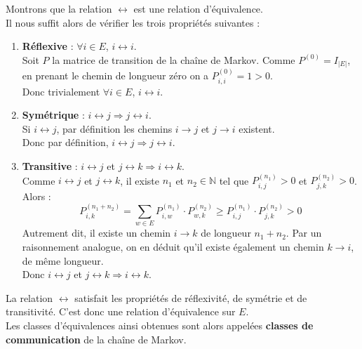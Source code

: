 \documentclass{article}
\begin{document}
\begin{tcolorbox}[colback=white,colframe=green!80!black,title=Démonstration, breakable]
Montrons que la relation $\leftrightarrow$ est une relation d'équivalence. \\

Il nous suffit alors de vérifier les trois propriétés suivantes :
\begin{enumerate}
    \item \textbf{Réflexive} : $\forall i \in E$, $i \leftrightarrow i$. \\
        Soit $P$ la matrice de transition de la chaîne de Markov.
        Comme $P^{(0)} = I_{|E|}$, en prenant le chemin de longueur zéro on a $P_{i,i}^{(0)} = 1 > 0$. \\
        Donc trivialement $\forall i \in E$, $i \leftrightarrow i$.
    \item \textbf{Symétrique} : $i \leftrightarrow j \Rightarrow j \leftrightarrow i$. \\
        Si $i \leftrightarrow j$, par définition les chemins $i \to j$ et $j \to i$ existent. \\
        Donc par définition, $i \leftrightarrow j \Rightarrow j \leftrightarrow i$.
\newpage %
    \item \textbf{Transitive} : $i \leftrightarrow j$ et $j \leftrightarrow k \Rightarrow i \leftrightarrow k$. \\
        Comme $i \leftrightarrow j$ et $j \leftrightarrow k$, il existe $n_1$ et $n_2 \in \mathbb{N}$ tel que $P_{i,j}^{(n_1)} > 0$ et $P_{j,k}^{(n_2)} > 0$. Alors :
        \[
        P_{i,k}^{(n_1+n_2)} = \sum_{w \in E} P_{i,w}^{(n_1)} \cdot P_{w,k}^{(n_2)} \geq P_{i,j}^{(n_1)} \cdot P_{j,k}^{(n_2)} > 0
        \]
        Autrement dit, il existe un chemin $i \to k$ de longueur $n_1+n_2$. Par un raisonnement analogue, on en déduit qu'il existe également un chemin $k \to i$, de même longueur. \\
        Donc $i \leftrightarrow j$ et $j \leftrightarrow k \Rightarrow i \leftrightarrow k$. \\
\end{enumerate}

La relation $\leftrightarrow$ satisfait les propriétés de réflexivité, de symétrie et de transitivité. C'est donc une relation d'équivalence sur $E$. \\
Les classes d'équivalences ainsi obtenues sont alors appelées \textbf{classes de communication} de la chaîne de Markov.
\end{tcolorbox}
\end{document}
